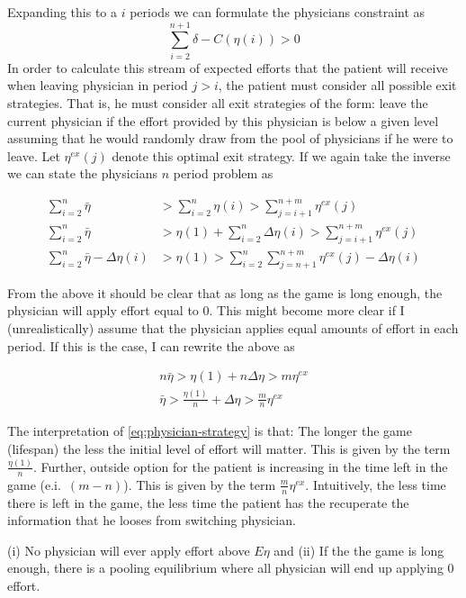  Expanding this to a $i$ periods we can formulate the physicians constraint as 
 \[
     \sum_{i=2}^{n+1}\delta-C(\eta(i))>0
 \]
In order to calculate this stream of expected efforts that the patient will receive when leaving physician in period $j>i$, the patient must consider all possible exit strategies. That is, he must consider all exit strategies of the form: leave the current physician if the effort provided by this physician is below a given level  assuming that he would randomly draw from the pool of physicians if he were to leave. Let $\eta^{ex}(j)$ denote this optimal exit strategy. If we again take the inverse we can state the physicians $n$ period problem as 

\begin{align*}
    \sum_{i=2}^{n} \bar{\eta} &> \sum_{i=2}^{n} \eta(i) > \sum_{j=i+1}^{n+m}  \eta^{ex}(j) \\
    \sum_{i=2}^{n} \bar{\eta} &> \eta(1)+\sum_{i=2}^{n} \Delta\eta(i)  > \sum_{j=i+1}^{n+m}  \eta^{ex}(j) \\
    \sum_{i=2}^{n}\bar{\eta}-\Delta\eta(i) &>\eta(1)>\sum_{i=2}^{n}\sum_{j=n+1}^{n+m}\eta^{ex}(j)-\Delta\eta(i)
\end{align*}

From the above it should be clear that as long as the game is long enough, the physician will apply effort equal to 0. This might become more clear if I (unrealistically) assume that the physician applies equal amounts of effort in each period. If this is the case, I can rewrite the above as 

\begin{align}
     n\bar{\eta} >  \eta(1)+n\Delta\eta  > m\eta^{ex} \\
     \bar{\eta} >  \frac{\eta(1)}{n}+\Delta\eta > \frac{m}{n}\eta^{ex} \label{eq:physician-strategy}
\end{align}

 The interpretation of \cref{eq:physician-strategy} is that: The longer the game (lifespan) the less the initial level of effort will matter. This is given by the term $\frac{\eta(1)}{n}$. Further, outside option for the patient is increasing in the time left in the game (e.i.\ $(m-n)$). This is given by the term $\frac{m}{n}\eta^{ex}$. Intuitively, the less time there is left in the game, the less time the patient has the recuperate the information that he looses from switching physician. 

\begin{proposition}
    (i) No physician will ever apply effort above $E\eta$ and (ii) If the the game is long enough, there is a pooling equilibrium where all physician will end up applying 0 effort.
\end{proposition}

\printbibliography%



